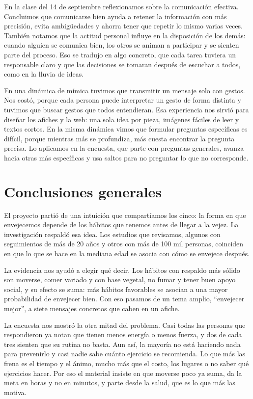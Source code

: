 \documentclass[12pt, letterpaper, table, xcdraw]{extarticle}
\begin{document}
En la clase del 14 de septiembre reflexionamos sobre la comunicación efectiva. Concluimos que comunicarse bien ayuda a retener la información con más precisión, evita ambigüedades y ahorra tener que repetir lo mismo varias veces. También notamos que la actitud personal influye en la disposición de los demás: cuando alguien se comunica bien, los otros se animan a participar y se sienten parte del proceso. Eso se tradujo en algo concreto, que cada tarea tuviera un responsable claro y que las decisiones se tomaran después de escuchar a todos, como en la lluvia de ideas.

En una dinámica de mímica tuvimos que transmitir un mensaje solo con gestos. Nos costó, porque cada persona puede interpretar un gesto de forma distinta y tuvimos que buscar gestos que todos entendieran. Esa experiencia nos sirvió para diseñar los afiches y la web: una sola idea por pieza, imágenes fáciles de leer y textos cortos. En la misma dinámica vimos que formular preguntas específicas es difícil, porque mientras más se profundiza, más cuesta encontrar la pregunta precisa. Lo aplicamos en la encuesta, que parte con preguntas generales, avanza hacia otras más específicas y usa saltos para no preguntar lo que no corresponde.
\clearpage


{}
\section*{Conclusiones generales}

El proyecto partió de una intuición que compartíamos los cinco: la forma en que envejecemos depende de los hábitos que tenemos antes de llegar a la vejez. La investigación respaldó esa idea. Los estudios que revisamos, algunos con seguimientos de más de 20 años y otros con más de 100 mil personas, coinciden en que lo que se hace en la mediana edad se asocia con cómo se envejece después.

La evidencia nos ayudó a elegir qué decir. Los hábitos con respaldo más sólido son moverse, comer variado y con base vegetal, no fumar y tener buen apoyo social, y su efecto se suma: más hábitos favorables se asocian a una mayor probabilidad de envejecer bien. Con eso pasamos de un tema amplio, ``envejecer mejor'', a siete mensajes concretos que caben en un afiche.

La encuesta nos mostró la otra mitad del problema. Casi todas las personas que respondieron ya notan que tienen menos energía o menos fuerza, y dos de cada tres sienten que su rutina no basta. Aun así, la mayoría no está haciendo nada para prevenirlo y casi nadie sabe cuánto ejercicio se recomienda. Lo que más las frena es el tiempo y el ánimo, mucho más que el costo, los lugares o no saber qué ejercicios hacer. Por eso el material insiste en que moverse poco ya suma, da la meta en horas y no en minutos, y parte desde la salud, que es lo que más las motiva.
\end{document}

